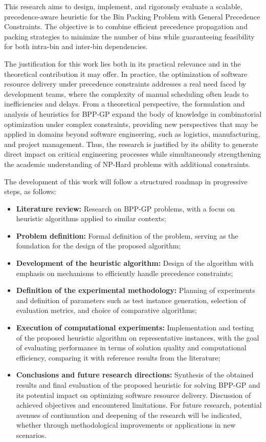 \documentclass[12pt]{article}
\begin{document}
This research aims to design, implement, and rigorously evaluate a scalable, precedence-aware heuristic for the Bin Packing Problem with General Precedence Constraints. The objective is to combine efficient precedence propagation and packing strategies to minimize the number of bins while guaranteeing feasibility for both intra-bin and inter-bin dependencies. 

The justification for this work lies both in its practical relevance and in the theoretical contribution it may offer. In practice, the optimization of software resource delivery under precedence constraints addresses a real need faced by development teams, where the complexity of manual scheduling often leads to inefficiencies and delays. From a theoretical perspective, the formulation and analysis of heuristics for BPP-GP expand the body of knowledge in combinatorial optimization under complex constraints, providing new perspectives that may be applied in domains beyond software engineering, such as logistics, manufacturing, and project management. Thus, the research is justified by its ability to generate direct impact on critical engineering processes while simultaneously strengthening the academic understanding of NP-Hard problems with additional constraints.

The development of this work will follow a structured roadmap in progressive steps, as follows:
\begin{itemize}
    \item \textbf{Literature review:} Research on BPP-GP problems, with a focus on heuristic algorithms applied to similar contexts;
    \item \textbf{Problem definition:} Formal definition of the problem, serving as the foundation for the design of the proposed algorithm;
    \item \textbf{Development of the heuristic algorithm:} Design of the algorithm with emphasis on mechanisms to efficiently handle precedence constraints;
    \item \textbf{Definition of the experimental methodology:} Planning of experiments and definition of parameters such as test instance generation, selection of evaluation metrics, and choice of comparative algorithms;
    \item \textbf{Execution of computational experiments:} Implementation and testing of the proposed heuristic algorithm on representative instances, with the goal of evaluating performance in terms of solution quality and computational efficiency, comparing it with reference results from the literature;
    \item \textbf{Conclusions and future research directions:} Synthesis of the obtained results and final evaluation of the proposed heuristic for solving BPP-GP and its potential impact on optimizing software resource delivery. Discussion of achieved objectives and encountered limitations. For future research, potential avenues of continuation and deepening of the research will be indicated, whether through methodological improvements or applications in new scenarios.
\end{itemize}
\end{document}
